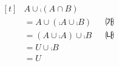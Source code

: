 $\begin{aligned}[t] &A\cup\comp{(A\cap B)}\\ &=A\cup(\comp{A}\cup\comp{B}) && \text{㈎}\\ &=(A\cup\comp{A})\cup\comp{B} && \text{㈏}\\ &=U\cup\comp{B}\\ &=U \end{aligned}$
